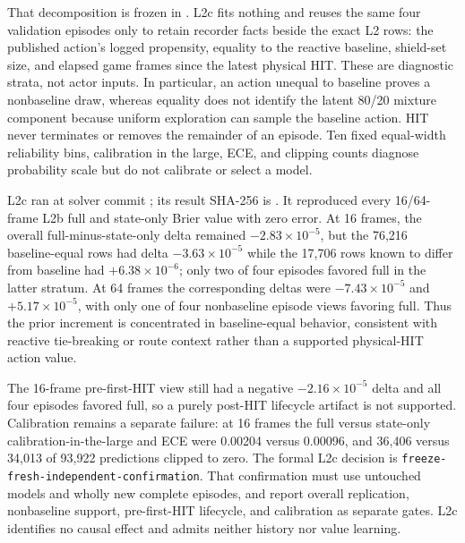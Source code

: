 \documentclass[11pt]{article}
\begin{document}
That decomposition is frozen in
.  L2c fits nothing and
reuses the same four validation episodes only to retain recorder facts beside
the exact L2 rows: the published action's logged propensity, equality to the
reactive baseline, shield-set size, and elapsed game frames since the latest
physical HIT.  These are diagnostic strata, not actor inputs.  In particular,
an action unequal to baseline proves a nonbaseline draw, whereas equality does
not identify the latent 80/20 mixture component because uniform exploration
can sample the baseline action.  HIT never terminates or removes the remainder
of an episode.  Ten fixed equal-width reliability bins, calibration in the
large, ECE, and clipping counts diagnose probability scale but do not calibrate
or select a model.

L2c ran at solver commit
; its result SHA-256 is
.
It reproduced every 16/64-frame L2b full and state-only Brier value with zero
error.  At 16 frames, the overall full-minus-state-only delta remained
$-2.83\times10^{-5}$, but the 76,216 baseline-equal rows had delta
$-3.63\times10^{-5}$ while the 17,706 rows known to differ from baseline had
$+6.38\times10^{-6}$; only two of four episodes favored full in the latter
stratum.  At 64 frames the corresponding deltas were
$-7.43\times10^{-5}$ and $+5.17\times10^{-5}$, with only one of four
nonbaseline episode views favoring full.  Thus the prior increment is
concentrated in baseline-equal behavior, consistent with reactive tie-breaking
or route context rather than a supported physical-HIT action value.

The 16-frame pre-first-HIT view still had a negative
$-2.16\times10^{-5}$ delta and all four episodes favored full, so a purely
post-HIT lifecycle artifact is not supported.  Calibration remains a separate
failure: at 16 frames the full versus state-only calibration-in-the-large and
ECE were 0.00204 versus 0.00096, and 36,406 versus 34,013 of 93,922 predictions
clipped to zero.  The formal L2c decision is
\texttt{freeze-fresh-independent-confirmation}.  That confirmation must use
untouched models and wholly new complete episodes, and report overall
replication, nonbaseline support, pre-first-HIT lifecycle, and calibration as
separate gates.  L2c identifies no causal effect and admits neither history nor
value learning.
\end{document}
